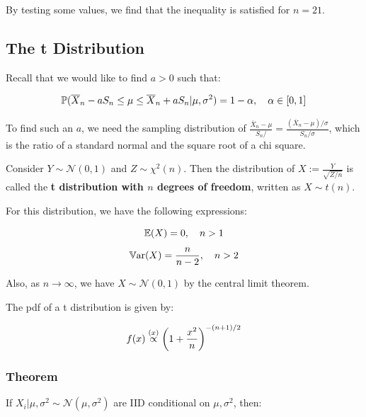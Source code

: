 \documentclass[a4paper]{article}
\begin{document}
                By testing some values, we find that the inequality is satisfied
                for $n = 21$.

        \subsection{The t Distribution}
            Recall that we would like to find $a > 0$ such that:

            \[
                \mathbb{P}(\overline X_n - a S_n \leq \mu \leq \overline X_n + aS_n|
                \mu, \sigma^2) = 1 - \alpha, \quad \alpha \in [0, 1]
            \]

            To find such an $a$, we need the sampling distribution of
            $\frac{\overline X_n - \mu}{S_n/} = \frac{(\overline X_n -
            \mu)/\sigma}{S_n/\sigma}$, which is the ratio of a standard normal
            and the square root of a chi square.

            \begin{definition}
                Consider $Y \sim \mathcal{N}(0, 1)$ and $Z \sim \chi^2(n)$. Then
                the distribution of $X := \frac{Y}{\sqrt{Z/n}}$ is called the
                \textbf{t distribution with $n$ degrees of freedom}, written as
                $X \sim t(n)$.

                For this distribution, we have the following expressions:

                \[
                    \mathbb{E}(X) = 0, \quad n > 1
                \]
                \[
                    \mathbb{V}\text{ar}(X) = \frac{n}{n - 2}, \quad  n > 2
                \]

                Also, as $n \to \infty$, we have $X \sim \mathcal{N}(0, 1)$ by
                the central limit theorem.

                The pdf of a t distribution is given by:

                \[
                    f(x) \stackrel{({x})}{\propto} \left(1 + \frac{x^2}{n}\right)
                    ^{-(n + 1)/2}
                \]
            \end{definition}

            \subsubsection{Theorem}
                If $X_i | \mu, \sigma^2 \sim \mathcal{N}(\mu, \sigma^2)$ are IID
                conditional on $\mu, \sigma^2$, then:
\end{document}

